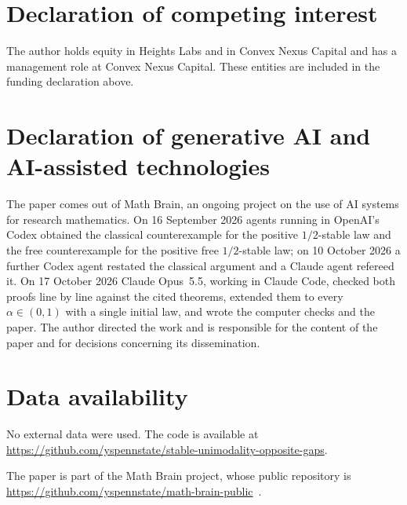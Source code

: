 \documentclass[11pt]{amsart}
\theoremstyle{definition}
\theoremstyle{remark}
\numberwithin{equation}{section}
\begin{document}
\section*{Declaration of competing interest}
The author holds equity in Heights Labs and in Convex Nexus Capital and
has a management role at Convex Nexus Capital. These entities are included
in the funding declaration above.

\section*{Declaration of generative AI and AI-assisted technologies}
The paper comes out of Math Brain, an ongoing project on the use of AI systems for research mathematics. On 16 September 2026 agents running in OpenAI's Codex obtained the classical counterexample for the positive $1/2$-stable law and the free counterexample for the positive free $1/2$-stable law; on 10 October 2026 a further Codex agent restated the classical argument and a Claude agent refereed it. On 17 October 2026 Claude Opus~5.5, working in Claude Code, checked both proofs line by line against the cited theorems, extended them to every $\alpha\in(0,1)$ with a single initial law, and wrote the computer checks and the paper. The author directed the work and is responsible for the content of the paper and for decisions concerning its dissemination.

\section*{Data availability}
No external data were used. The code is available at\\ \url{https://github.com/yspennstate/stable-unimodality-opposite-gaps}.

The paper is part of the Math Brain project, whose public repository is \url{https://github.com/yspennstate/math-brain-public}~\cite{MathBrainRepo}.
\end{document}
